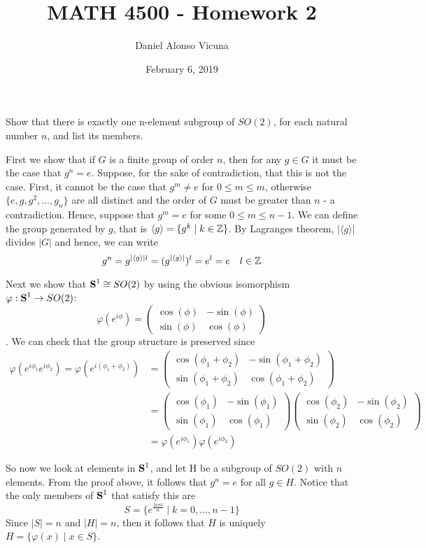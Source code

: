 \documentclass[11pt,onecolumn]{article}
\title{MATH 4500 - Homework 2}
\author{Daniel Alonso Vicuna}
\date{February 6, 2019}
\begin{document}
\maketitle

\begin{exercise}
Show that there is exactly one n-element subgroup of $SO(2)$, for each natural number $n$, and list its members. 
\end{exercise}
\begin{answer}

First we show that if $G$ is a finite group of order $n$, then for any $g \in G$ it must be the case that $g^n = e$. Suppose, for the sake of contradiction, that this is not the case. First, it cannot be the case that $g^m \neq e$ for $0 \leq m \leq m$, otherwise $\{e,g,g^2,...,g_n\}$ are all distinct and the order of $G$ must be greater than $n$ - a contradiction. Hence, suppose that $g^m = e$ for some $0 \leq m \leq n-1$. We can define the group generated by $g$, that is $\langle g \rangle = \{ g^k \mid k \in \operatorname{\mathbb{Z}}\}$. By Lagranges theorem, $|\langle g \rangle|$ divides $|G|$ and hence, we can write $$g^n = g^{|\langle g\rangle|l} = (g^{|\langle g\rangle|})^l = e^l = e \quad l \in \operatorname{\mathbb{Z}}$$

Next we show that $\operatorname{\mathbf{S}}^1 \cong SO(2)$ by using the obvious isomorphism $\varphi: \operatorname{\mathbf{S}}^1 \rightarrow SO(2)$:
$$ \varphi(e^{i\phi}) = \begin{pmatrix} \cos(\phi) & -\sin(\phi) \\ \sin(\phi) & \cos(\phi) \end{pmatrix} $$. We can check that the group structure is preserved since
\begin{align*}
\varphi(e^{i\phi_1}e^{i\phi_2}) = \varphi(e^{i(\phi_1+\phi_2)}) &=  \begin{pmatrix} \cos(\phi_1 + \phi_2) & -\sin(\phi_1 + \phi_2) \\ \sin(\phi_1 + \phi_2) & \cos(\phi_1 + \phi_2) \end{pmatrix} \\
&=\begin{pmatrix} \cos(\phi_1 ) & -\sin(\phi_1) \\ \sin(\phi_1) & \cos(\phi_1) \end{pmatrix} \begin{pmatrix} \cos(\phi_2) & -\sin(\phi_2) \\ \sin( \phi_2) & \cos( \phi_2) \end{pmatrix}\\
&= \varphi(e^{i\phi_1})\varphi(e^{i\phi_2})
\end{align*}

So now we look at elements in $\operatorname{\mathbf{S}}^1$, and let H be a subgroup of $SO(2)$ with $n$ elements. From the proof above, it follows that $g^n = e $ for all $g \in H$. Notice that the only members of $\operatorname{\mathbf{S}}^1$ that satisfy this are
$$S = \{ e^\frac{2i\pi k}{n} \mid k=0,...,n-1\}$$
Since $|S| = n$ and $|H|= n$, then it follows that $H$ is uniquely $H  = \{ \varphi(x) \mid x \in S\}$.


\end{answer}
\end{document}
